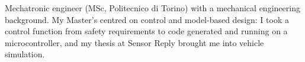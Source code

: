 \vspace{-15pt}

Mechatronic engineer (MSc, Politecnico di Torino) with a mechanical engineering background. My Master's centred on control and model-based design: I took a control function from safety requirements to code generated and running on a microcontroller, and my thesis at Sensor Reply brought me into vehicle simulation.
